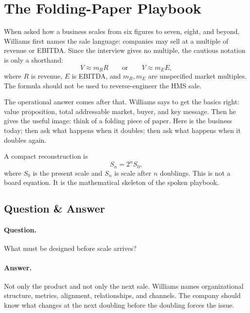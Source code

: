 \documentclass[11pt,oneside]{book}
\begin{document}
\section{The Folding-Paper Playbook}

When asked how a business scales from six figures to seven, eight, and beyond, Williams first names the sale language: companies may sell at a multiple of revenue or EBITDA. Since the interview gives no multiple, the cautious notation is only a shorthand:
\[
V\approx m_RR
\qquad\text{or}\qquad
V\approx m_EE,
\]
where \(R\) is revenue, \(E\) is EBITDA, and \(m_R,m_E\) are unspecified market multiples. The formula should not be used to reverse-engineer the HMS sale.

The operational answer comes after that. Williams says to get the basics right: value proposition, total addressable market, buyer, and key message. Then he gives the useful image: think of a folding piece of paper. Here is the business today; then ask what happens when it doubles; then ask what happens when it doubles again.

A compact reconstruction is
\[
S_n=2^nS_0,
\]
where \(S_0\) is the present scale and \(S_n\) is scale after \(n\) doublings. This is not a board equation. It is the mathematical skeleton of the spoken playbook.

\subsection{Question \& Answer}

\paragraph{Question.}
What must be designed before scale arrives?

\paragraph{Answer.}
Not only the product and not only the next sale. Williams names organizational structure, metrics, alignment, relationships, and channels. The company should know what changes at the next doubling before the doubling forces the issue.
\end{document}

